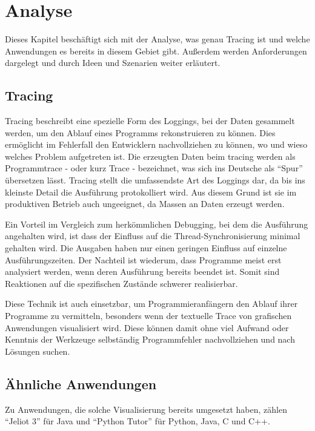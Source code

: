
\chapter{Analyse}

Dieses Kapitel beschäftigt sich mit der Analyse, was genau Tracing ist und welche Anwendungen es bereits in diesem Gebiet gibt. Außerdem werden Anforderungen dargelegt und durch Ideen und Szenarien weiter erläutert.

\section{Tracing} 

Tracing beschreibt eine spezielle Form des Loggings, bei der Daten gesammelt werden, um den Ablauf eines Programms rekonstruieren zu können. Dies ermöglicht im Fehlerfall den Entwicklern nachvollziehen zu können, wo und wieso welches Problem aufgetreten ist. Die erzeugten Daten beim tracing werden als Programmtrace - oder kurz Trace - bezeichnet, was sich ins Deutsche als "`Spur"' übersetzen lässt. Tracing stellt die umfassendste Art des Loggings dar, da bis ins kleinste Detail die Ausführung protokolliert wird. Aus diesem Grund ist sie im produktiven Betrieb auch ungeeignet, da Massen an Daten erzeugt werden.

Ein Vorteil im Vergleich zum herkömmlichen Debugging, bei dem die Ausführung angehalten wird, ist dass der Einfluss auf die Thread-Synchronisierung minimal gehalten wird. Die Ausgaben haben nur einen geringen Einfluss auf einzelne Ausführungszeiten. Der Nachteil ist wiederum, dass Programme meist erst analysiert werden, wenn deren Ausführung bereits beendet ist. Somit sind Reaktionen auf die spezifischen Zustände schwerer realisierbar.

Diese Technik ist auch einsetzbar, um Programmieranfängern den Ablauf ihrer Programme zu vermitteln, besonders wenn der textuelle Trace von grafischen Anwendungen visualisiert wird. Diese können damit ohne viel Aufwand oder Kenntnis der Werkzeuge selbständig Programmfehler nachvollziehen und nach Lösungen suchen.

\section{Ähnliche Anwendungen} 

Zu Anwendungen, die solche Visualisierung bereits umgesetzt haben, zählen "`Jeliot 3"' für Java und "`Python Tutor"' für Python, Java, C und C++.

